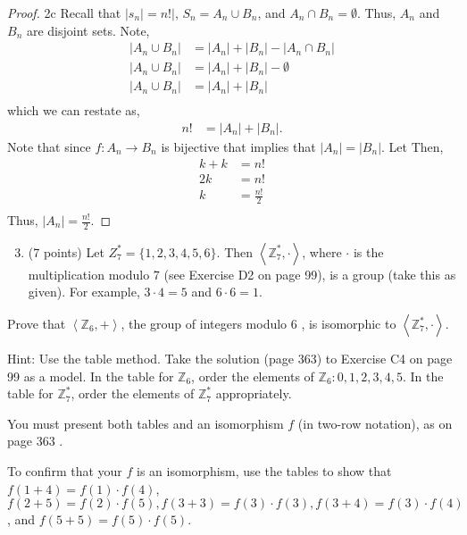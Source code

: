 \documentclass[12pt]{article}
\begin{document}
\begin{proof}{2c} Recall that $|s_n| = n! |$, $S_n = A_n \cup B_n$, and $A_n \cap B_n = \emptyset$. 
Thus, $A_n$ and $B_n$ are disjoint sets. Note,
$$
\begin{aligned}
	|A_n \cup B_n| &= |A_n| + |B_n| - |A_n \cap B_n| \\
	|A_n \cup B_n| &= |A_n| + |B_n| - \emptyset \\
	|A_n \cup B_n| &= |A_n| + |B_n| \\
\end{aligned}
$$
which we can restate as,
$$
\begin{aligned}
	n! &= |A_n| + |B_n|.
\end{aligned}
$$
Note that since $f:A_n\rightarrow B_n$ is bijective that implies that $|A_n|=|B_n|$. Let
Then, 
$$
\begin{aligned}
	k+k &= n! \\
	2k &= n! \\
	k &= \frac{n!}{2} \\
\end{aligned}
$$
Thus, $|A_n|= \frac{n!}{2}$.
\end{proof}

\begin{enumerate}
  \setcounter{enumi}{2}
  \item (7 points) Let $Z_{7}^{*}=\{1,2,3,4,5,6\}$. Then $\left\langle\mathbb{Z}_{7}^{*}, \cdot\right\rangle$, where $\cdot$ is the multiplication modulo 7 (see Exercise D2 on page 99), is a group (take this as given). For example, $3 \cdot 4=5$ and $6 \cdot 6=1$.
\end{enumerate}

Prove that $\left\langle\mathbb{Z}_{6},+\right\rangle$, the group of integers modulo 6 , is isomorphic to $\left\langle\mathbb{Z}_{7}^{*}, \cdot\right\rangle$.

Hint: Use the table method. Take the solution (page 363) to Exercise C4 on page 99 as a model. In the table for $\mathbb{Z}_{6}$, order the elements of $\mathbb{Z}_{6}: 0,1,2,3,4,5$. In the table for $\mathbb{Z}_{7}^{*}$, order the elements of $\mathbb{Z}_{7}^{*}$ appropriately.

You must present both tables and an isomorphism $f$ (in two-row notation), as on page 363 .

To confirm that your $f$ is an isomorphism, use the tables to show that $f(1+4)=f(1) \cdot f(4)$, $f(2+5)=f(2) \cdot f(5), f(3+3)=f(3) \cdot f(3), f(3+4)=f(3) \cdot f(4)$, and $f(5+5)=f(5) \cdot f(5)$.
\end{document}
